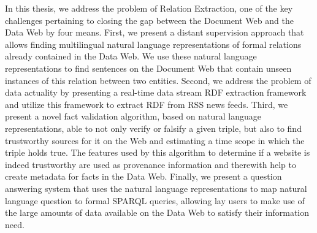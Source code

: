 In this thesis, we address the problem of Relation Extraction, one of the key challenges pertaining to closing the gap between the Document Web and the Data Web by four means.
First, we present a distant supervision approach that allows finding multilingual natural language representations of formal relations already contained in the Data Web.
We use these natural language representations to find sentences on the Document Web that contain unseen instances of this relation between two entities. 
Second, we address the problem of data actuality by presenting a real-time data stream RDF extraction framework and utilize this framework to extract RDF from RSS news feeds.
Third, we present a novel fact validation algorithm, based on natural language representations, able to not only verify or falsify a given triple, but also to find trustworthy sources for it on the Web and estimating a time scope in which the triple holds true.
The features used by this algorithm to determine if a website is indeed trustworthy are used as provenance information and therewith help to create metadata for facts in the Data Web.
Finally, we present a question answering system that uses the natural language representations to map natural language question to formal SPARQL queries, allowing lay users to make use of the large amounts of data available on the Data Web to satisfy their information need.

\newpage
%
